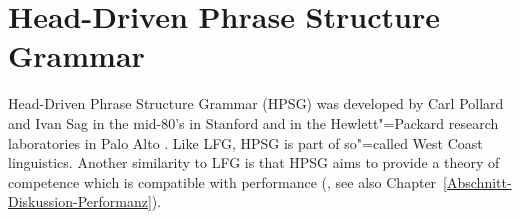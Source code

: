 
\chapter{Head-Driven Phrase Structure Grammar}
\label{Kapitel-HPSG}
\label{chap-HPSG}

Head-Driven Phrase Structure Grammar (HPSG) was developed by Carl Pollard and
Ivan Sag in the mid-80's in Stanford and in the Hewlett"=Packard research laboratories in Palo Alto
\citep{ps,ps2}. Like LFG, HPSG is part of so"=called West Coast linguistics. Another similarity to
LFG is that HPSG aims to provide a theory of competence which is compatible with performance
(\citealp{SW2011a,SW2015a}, see also Chapter~\ref{Abschnitt-Diskussion-Performanz}).  

